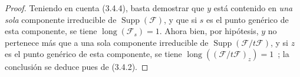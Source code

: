 \begin{proof}
Teniendo en cuenta (3.4.4), basta demostrar que $y$ está contenido en \emph{una
sola} componente irreducible de $\operatorname{Supp}(\mathcal F)$, y
que si $s$ es el punto genérico de esta componente, se tiene
$\operatorname{long}(\mathcal F_s)=1$. Ahora bien, por hipótesis, $y$ no
pertenece más que a una sola componente irreducible de
$\operatorname{Supp}(\mathcal F/t\mathcal F)$, y si $z$ es el punto
genérico de esta componente, se tiene
$\operatorname{long}((\mathcal F/t\mathcal F)_z)=1$~; la conclusión se deduce
pues de (3.4.2).
\end{proof}
